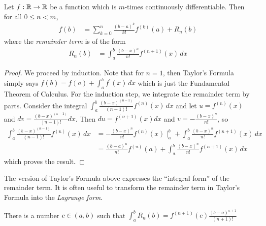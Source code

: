 \begin{thm}\label{TaylorsTheorem}Let $f: \mathbb{R}\to
  \mathbb{R}$ be a function which is $m$-times continuously differentiable.  Then for all
  $0 \leq n < m$,
\begin{align*}
f(b) &= \sum_{k=0}^n \frac{(b-a)^k}{k!} f^{(k)}(a) + R_n(b)
\end{align*}
where the \emph{remainder term} is of the form
\begin{align*}
R_n(b) &= \int_a^b
\frac{(b-x)^n}{n!} f^{(n+1)}(x) \, dx
\end{align*}
\end{thm}
\begin{proof}
We proceed by induction.  Note that for $n=1$, then Taylor's Formula simply says $f(b) = f(a) +
\int_a^b f^\prime(x) \, dx$ which is just the Fundamental Theorem of
Calculus.  For the induction step, we integrate the remainder term by parts.  Consider
the integral $\int_a^b \frac{(b-x)^{(n-1)}}{(n-1)!} f^{(n)}(x) \, dx$ and let
$u = f^{(n)}(x)$ and $dv = \frac{(b-x)^{(n-1)}}{(n-1)!} dx$.  Then $du =
f^{(n+1)}(x) dx$ and $v = -\frac{(b-x)^n}{n!}$, so 
\begin{align*}
\int_a^b \frac{(b-x)^{(n-1)}}{(n-1)!} f^{(n)}(x) \, dx &=
-\frac{(b-x)^n}{n!} f^{(n)}(x) \mid_a^b + \int_a^b \frac{(b-x)^n}{n!}
f^{(n+1)}(x) \, dx \\
&= \frac{(b-a)^n}{n!} f^{(n)}(a) + \int_a^b \frac{(b-x)^n}{n!}
f^{(n+1)}(x) \, dx
\end{align*}
which proves the result.
\end{proof}
The version of Taylor's Formula above expresses the ``integral form''
of the remainder term.  It is often useful to transform the remainder term in Taylor's Formula
into the \emph{Lagrange form}.
\begin{lem}\label{LagrangeFormRemainder}There is a number $c \in
  (a,b)$ such that $\int_a^b
R_n(b)= f^{(n+1)}(c) \frac{(b-a)^{n+1}}{(n+1)!}$
\end{lem}
